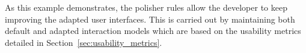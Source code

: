 As this example demonstrates, the polisher rules allow the developer to keep
improving the adapted user interfaces. This is carried out by maintaining both
default and adapted interaction models which are based on the usability metrics
detailed in Section~\ref{sec:usability_metrics}.

% 
